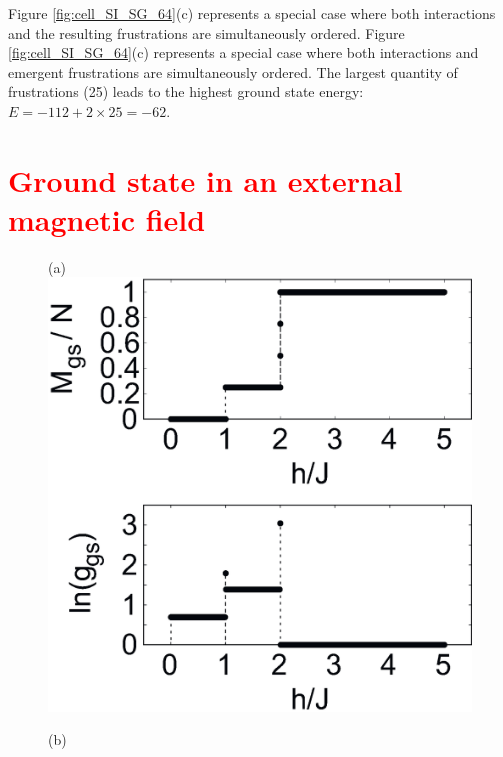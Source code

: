 \documentclass[preprint,12pt]{elsarticle}
\begin{document}
	Figure \ref{fig:cell_SI_SG_64}(c) represents a special case where both interactions and the resulting frustrations are simultaneously ordered. Figure \ref{fig:cell_SI_SG_64}(c) represents a special case where both interactions and emergent frustrations are simultaneously ordered. The largest quantity of frustrations (25) leads to the highest ground state energy: $E = -112 + 2\times25 = -62$.
	

	\section{\textcolor{red}{Ground state in an external magnetic field}}

	\begin{figure}[H]
		\begin{minipage}[h]{0.32\linewidth}
			\centering
			\hspace{1cm}(a)
			\includegraphics[width=1\linewidth]{pictures/_multiplot_SI64_J0_1}
		\end{minipage}
		\hfill
		\begin{minipage}[h]{0.32\linewidth}
			\centering
			\hspace{1cm}(b)

\end{minipage}
\end{figure}
\end{document}
